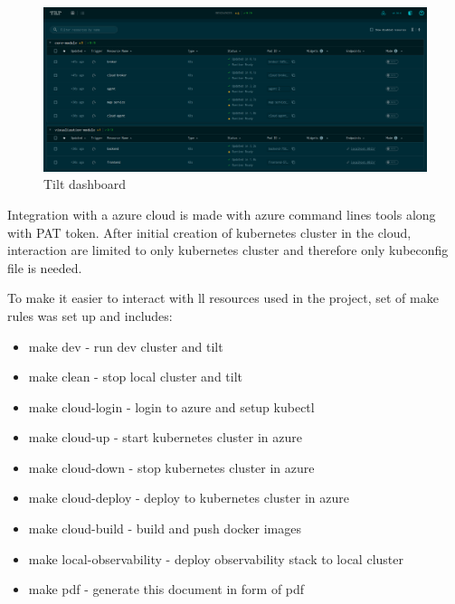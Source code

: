 \begin{figure}[H]
    \centering
    \includegraphics[width=\textwidth]{pictures/tilt.png}
    \caption{ Tilt dashboard}
    \label{fig:tilt}
\end{figure}

Integration with a azure cloud is made with azure command lines tools along with PAT token. After initial creation of kubernetes cluster in the cloud, interaction are limited to only kubernetes cluster and therefore only kubeconfig file is needed.

To make it easier to interact with ll resources used in the project, set of make rules was set up and includes:
\begin{itemize}
    \item make dev - run dev cluster and tilt
	\item make clean - stop local cluster and tilt
	\item make cloud-login - login to azure and setup kubectl
	\item make cloud-up - start kubernetes cluster in azure
	\item make cloud-down - stop kubernetes cluster in azure
	\item make cloud-deploy - deploy to kubernetes cluster in azure
	\item make cloud-build - build and push docker images
	\item make local-observability - deploy observability stack to local cluster
	\item make pdf - generate this document in form of pdf
\end{itemize}